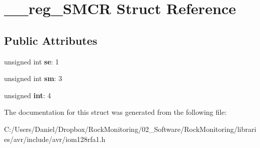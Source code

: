 \hypertarget{struct____reg___s_m_c_r}{}\section{\+\_\+\+\_\+reg\+\_\+\+S\+M\+CR Struct Reference}
\label{struct____reg___s_m_c_r}
\subsection*{Public Attributes}
\begin{DoxyCompactItemize}
\item 
unsigned int {\bfseries se}\+: 1\hypertarget{struct____reg___s_m_c_r_ae2f266e400544c3a0a06785ce2d35913}{}\label{struct____reg___s_m_c_r_ae2f266e400544c3a0a06785ce2d35913}

\item 
unsigned int {\bfseries sm}\+: 3\hypertarget{struct____reg___s_m_c_r_ab516d59240cb6797018f586070188249}{}\label{struct____reg___s_m_c_r_ab516d59240cb6797018f586070188249}

\item 
unsigned {\bfseries int}\+: 4\hypertarget{struct____reg___s_m_c_r_af818a4725e74086252f9d138cf9b4822}{}\label{struct____reg___s_m_c_r_af818a4725e74086252f9d138cf9b4822}

\end{DoxyCompactItemize}


The documentation for this struct was generated from the following file\+:\begin{DoxyCompactItemize}
\item 
C\+:/\+Users/\+Daniel/\+Dropbox/\+Rock\+Monitoring/02\+\_\+\+Software/\+Rock\+Monitoring/libraries/avr/include/avr/iom128rfa1.\+h\end{DoxyCompactItemize}
